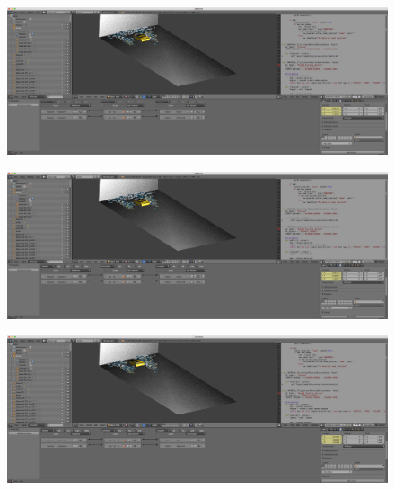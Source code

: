 \documentclass[10pt]{article}
\begin{document}
\begin{figure}[H]
	\begin{center}
	 		\includegraphics[width = 1.00\textwidth]{Imagenes/p6-img3}
	\end{center} 
\end{figure}

\begin{figure}[H]
	\begin{center}
	 		\includegraphics[width = 1.00\textwidth]{Imagenes/p6-img3}
	\end{center} 
\end{figure}

\begin{figure}[H]
	\begin{center}
	 		\includegraphics[width = 1.00\textwidth]{Imagenes/p6-img4}
	\end{center} 
\end{figure}
\end{document}
